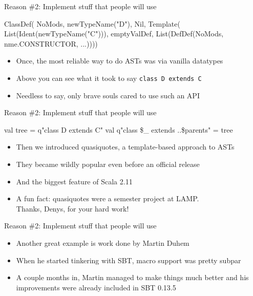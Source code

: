 \documentclass[svgnames,dvipsnames,hyperref={bookmarks=false},usepdftitle=false]{beamer}
\begin{document}
\begin{frame}[fragile]{Reason \#2: Implement stuff that people will use}
\begin{semiverbatim}
ClassDef(
  NoMods,
  newTypeName("D"),
  Nil,
  Template(
    List(Ident(newTypeName("C"))),
    emptyValDef,
    List(DefDef(NoMods, nme.CONSTRUCTOR, ...))))

\end{semiverbatim}
\begin{itemize}
\item Once, the most reliable way to do ASTs was via vanilla datatypes
\item Above you can see what it took to say \texttt{class D extends C}
\item Needless to say, only brave souls cared to use such an API
\end{itemize}
\end{frame}

\begin{frame}[fragile]{Reason \#2: Implement stuff that people will use}
\begin{semiverbatim}
val tree = q"class D extends C"
val q"class \$_ extends ..\$parents" = tree

\end{semiverbatim}
\begin{itemize}
\item Then we introduced quasiquotes, a template-based approach to ASTs
\item They became wildly popular even before an official release
\item And the biggest feature of Scala 2.11
\item \alert{A fun fact: quasiquotes were a semester project at LAMP.\\ Thanks, Denys, for your hard work!}
\end{itemize}
\end{frame}

\begin{frame}{Reason \#2: Implement stuff that people will use}
\begin{itemize}
\item Another great example is work done by Martin Duhem
\item When he started tinkering with SBT, macro support was pretty subpar
\item \alert{A couple months in, Martin managed to make things much better and his improvements were already included in SBT 0.13.5}
\end{itemize}
\end{frame}
\end{document}
